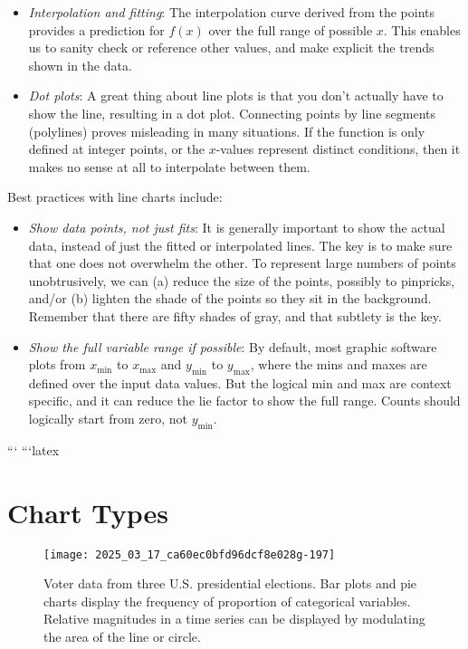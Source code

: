 \documentclass[10pt]{article}
\begin{document}
\begin{itemize}
  \item \emph{Interpolation and fitting}: The interpolation curve derived from the points provides a prediction for $f(x)$ over the full range of possible $x$. This enables us to sanity check or reference other values, and make explicit the trends shown in the data.
  \item \emph{Dot plots}: A great thing about line plots is that you don’t actually have to show the line, resulting in a dot plot. Connecting points by line segments (polylines) proves misleading in many situations. If the function is only defined at integer points, or the $x$-values represent distinct conditions, then it makes no sense at all to interpolate between them.
\end{itemize}

Best practices with line charts include:

\begin{itemize}
  \item \emph{Show data points, not just fits}: It is generally important to show the actual data, instead of just the fitted or interpolated lines. The key is to make sure that one does not overwhelm the other. To represent large numbers of points unobtrusively, we can (a) reduce the size of the points, possibly to pinpricks, and/or (b) lighten the shade of the points so they sit in the background. Remember that there are fifty shades of gray, and that subtlety is the key.
  \item \emph{Show the full variable range if possible}: By default, most graphic software plots from $x_{\text {min}}$ to $x_{\text {max}}$ and $y_{\text {min}}$ to $y_{\max}$, where the mins and maxes are defined over the input data values. But the logical min and max are context specific, and it can reduce the lie factor to show the full range. Counts should logically start from zero, not $y_{\min}$. 
\end{itemize}
```
```latex
\section{Chart Types}

\begin{figure}[h]
\centering
\texttt{[image: 2025\_03\_17\_ca60ec0bfd96dcf8e028g-197]}
\caption{Voter data from three U.S. presidential elections. Bar plots and pie charts display the frequency of proportion of categorical variables. Relative magnitudes in a time series can be displayed by modulating the area of the line or circle.}
\end{figure}
\end{document}
